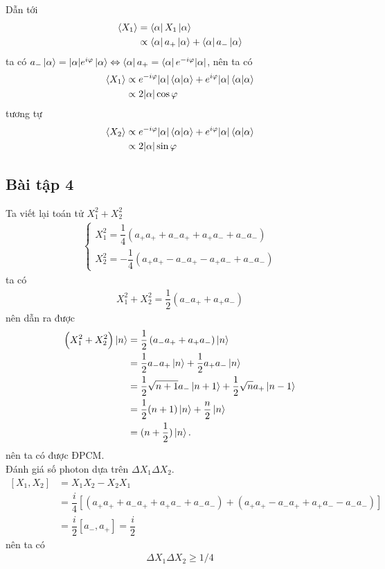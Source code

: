\documentclass{report}
\newcommand{\f}[2]{\dfrac{#1}{#2}}
\begin{document}
Dẫn tới
\begin{align*}
	\ev{X_{1}}
	&= \bra{\alpha} X_{1} \ket{\alpha}\\
	&\propto \bra{\alpha} a_{+} \ket{\alpha} + \bra{\alpha} a_{-} \ket{\alpha}
\end{align*}
ta có $a_{-} \ket{\alpha} = \abs{\alpha} e^{i \varphi}\ket{\alpha} \Leftrightarrow \bra{\alpha} a_{+} = \bra{\alpha}  e^{-i\varphi} \abs{\alpha} $, nên ta có
\begin{align*}
	\ev{X_{1}} 
	&\propto e^{- i \varphi} \abs{\alpha} \bra{\alpha} \ket{\alpha} + e^{i \varphi} \abs{\alpha} \bra{\alpha} \ket{\alpha}\\
	&\propto 2 \abs{\alpha} \cos \varphi
\end{align*}
tương tự
\begin{align*}
	\ev{X_{2}} 
	&\propto e^{- i \varphi} \abs{\alpha} \bra{\alpha} \ket{\alpha} + e^{i \varphi} \abs{\alpha} \bra{\alpha} \ket{\alpha}\\
	&\propto 2 \abs{\alpha} \sin \varphi
\end{align*}
\subsection*{Bài tập 4}
Ta viết lại toán tử $X_{1}^{2} + X_{2}^{2}$
\begin{align*}
	\begin{cases}
		X_{1}^{2} =\f{1}{4}  \left( a_{+} a_{+} + a_{-} a_{+} + a_{+} a_{-} + a_{-} a_{-}  \right)\\
		X_{2}^{2} =-\f{1}{4}  \left( a_{+} a_{+} - a_{-} a_{+} - a_{+} a_{-} + a_{-} a_{-}  \right)
	\end{cases}
\end{align*}
ta có
\begin{align*}
	X_{1}^{2} + X_{2}^{2} = \f{1}{2} \left(a_{-} a_{+} + a_{+} a_{-}\right)
\end{align*}	
nên dẫn ra được
\begin{align*}
	\left(X_{1}^{2} + X_{2}^{2}\right) \ket{n} 
	&= \f{1}{2} \left(a_{-} a_{+} + a_{+} a_{-}\right) \ket{n}\\
	&= \f{1}{2} a_{-} a_{+}  \ket{n} + \f{1}{2} a_{+} a_{-}  \ket{n} \\
	&= \f{1}{2} \sqrt{n+1}a_{-} \ket{n+1} + \f{1}{2} \sqrt{n} a_{+} \ket{n-1}\\
	&= \f{1}{2} (n + 1)\ket{n} + \f{n}{2} \ket{n}\\
	&= (n + \f{1}{2}) \ket{n}.
\end{align*}
nên ta có được ĐPCM.\\
Đánh giá số photon dựa trên $\Delta X_{1} \Delta X_{2}$.
\begin{align*}
	\left[ X_{1} , X_{2} \right] 
	&= X_{1} X_{2} - X_{2} X_{1}\\
	&= \f{i}{4} \left[ \left( a_{+} a_{+} + a_{-} a_{+} + a_{+} a_{-} + a_{-} a_{-} \right) + \left( a_{+} a_{+} - a_{-} a_{+} + a_{+} a_{-} - a_{-} a_{-} \right) \right]\\
	& = \f{i}{2} \left[ a_{-} , a_{+} \right] = \f{i}{2}
\end{align*}
nên ta có
\begin{align*}
	\Delta X_{1} \Delta X_{2} \geq 1 / 4 
\end{align*}
\end{document}
